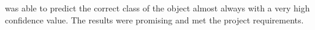 \documentclass[10pt,journal,compsoc]{IEEEtran}
\begin{document}
was able to predict the correct class of the object almost always with a very high confidence value. The results were promising and met the project requirements.



\end{document}
